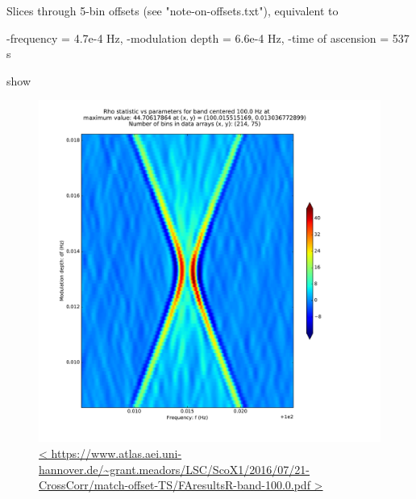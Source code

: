 \documentclass{article}
\begin{document}
Slices through 5-bin offsets (see "note-on-offsets.txt"), equivalent to

    -frequency = 4.7e-4 Hz,
    -modulation depth = 6.6e-4 Hz,
    -time of ascension = 537 s

show

\begin{figure}
\includegraphics[trim= 0 0 0 0, clip, width=0.40\paperwidth,keepaspectratio]{plots/match-offset-TS/FAresultsR-band-100-0.pdf}
\caption{
\url{<
https://www.atlas.aei.uni-hannover.de/~grant.meadors/LSC/ScoX1/2016/07/21-CrossCorr/match-offset-TS/FAresultsR-band-100.0.pdf
>}
}
\end{figure}
\end{document}
